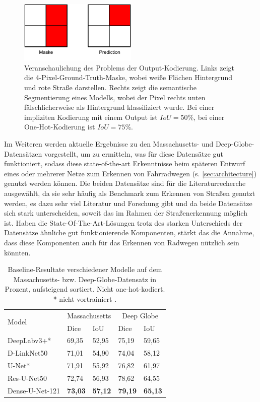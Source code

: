 \begin{figure}
	\centering
	\includegraphics[width=0.5\textwidth]{Bilder/output-enc-example.drawio.pdf} 
	\vspace{-5pt}
	\caption{Veranschaulichung des Problems der Output-Kodierung. Links zeigt die 4-Pixel-Ground-Truth-Maske, 
	wobei weiße Flächen Hintergrund und rote Straße darstellen. Rechts zeigt die semantische Segmentierung 
	eines Modells, wobei der Pixel rechts unten fälschlicherweise als Hintergrund klassifiziert wurde.
	Bei einer impliziten Kodierung mit einem Output ist $IoU = 50\%$, bei einer One-Hot-Kodierung ist $IoU = 75\%$.}
	\label{fig:problematic-output}
\end{figure} 

Im Weiteren werden aktuelle Ergebnisse zu den Massachusetts- und Deep-Globe-Datensätzen vorgestellt, 
um zu ermitteln, was für diese Datensätze gut funktioniert, sodass diese state-of-the-art Erkenntnisse beim 
späteren Entwurf eines oder mehrerer Netze zum Erkennen von Fahrradwegen (s. \autoref{sec:architecture}) 
genutzt werden können. Die beiden Datensätze sind für die Literaturrecherche ausgewählt, 
da sie sehr häufig als Benchmark zum Erkennen von Straßen genutzt werden, es dazu sehr viel Literatur und 
Forschung gibt und da beide Datensätze sich stark unterscheiden, soweit das im Rahmen der Straßenerkennung möglich ist. 
Haben die State-Of-The-Art-Lösungen trotz des starken Unterschieds der Datensätze ähnliche gut funktionierende
Komponenten, stärkt das die Annahme, dass diese Komponenten auch für das Erkennen von Radwegen nützlich sein könnten. 

\begin{table}[H]
	\centering
	\begin{tabular}{l|l|l|l|l}
		\multirow{2}{*}{Model} & \multicolumn{2}{c|}{Massachusetts} & \multicolumn{2}{c}{Deep Globe}  \\
		& Dice & IoU & Dice & IoU \\
		\midrule
		DeepLabv3+* & 69,35 & 52,95 & 75,19 & 59,65 \\
		D-LinkNet50 & 71,01 & 54,90 & 74,04 & 58,12 \\
		U-Net* & 71,91 & 55,92 & 76,82 & 61,97 \\
		Res-U-Net50 & 72,74 & 56,93 & 78,62 & 64,55  \\
		Dense-U-Net-121 & \textbf{73,03} & \textbf{57,12} & \textbf{79,19} & \textbf{65,13}  \\
	\end{tabular}
	\caption{Baseline-Resultate verschiedener Modelle auf dem Massachusetts- 
	bzw. Deep-Globe-Datensatz in Prozent, aufsteigend sortiert. Nicht one-hot-kodiert. \\ * nicht vortrainiert \cite{C.Henry.2021}.}
	\label{tab:basline-benchmarks}
\end{table}

